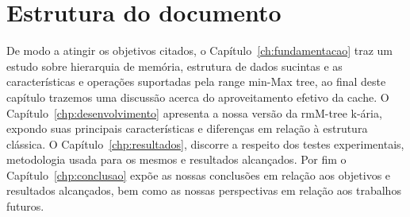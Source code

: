 


\section{Estrutura do documento}
De modo a atingir os objetivos citados, o Capítulo~\ref{ch:fundamentacao} traz um estudo sobre hierarquia de memória, estrutura de dados sucintas e as características e operações suportadas pela range min-Max tree, ao final deste capítulo trazemos uma discussão acerca do aproveitamento efetivo da cache. O Capítulo~\ref{chp:desenvolvimento} apresenta a nossa versão da rmM-tree k-ária, expondo suas principais características e diferenças em relação à estrutura clássica. O Capítulo~\ref{chp:resultados}, discorre a respeito dos testes experimentais, metodologia usada para os mesmos e resultados alcançados. Por fim o Capítulo~\ref{chp:conclusao} expõe as nossas conclusões em relação 
aos objetivos e resultados alcançados, bem como as nossas perspectivas em relação aos trabalhos futuros.


